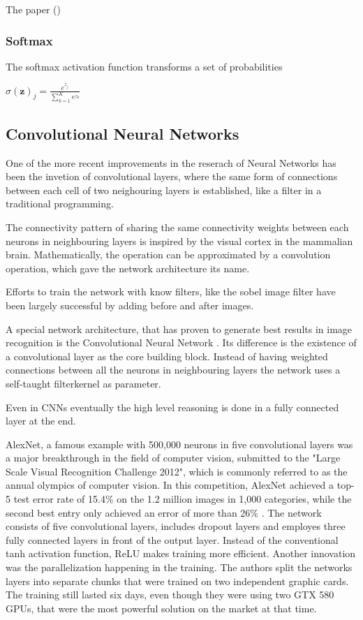The paper (\cite{DBLP:journals/corr/KlambauerUMH17})


\subsubsection{Softmax}
The softmax activation function transforms a set of probabilities

{\centering
	$\displaystyle \sigma (\mathbf {z} )_{j}={\frac {e^{z_{j}}}{\sum _{k=1}^{K}e^{z_{k}}}}$
	\par
}

\subsection{Convolutional Neural Networks}

One of the more recent improvements in the reserach of Neural Networks has been the invetion of convolutional layers, where the same form of connections between each cell of two neighouring layers is established, like a filter in a traditional programming. 

The connectivity pattern of sharing the same connectivity weights between each neurons in neighbouring layers is inspired by the visual cortex in the mammalian brain.
Mathematically, the operation can be approximated by a convolution operation, which gave the network architecture its name. 

Efforts to train the network with know filters, like the sobel image filter have been largely successful by adding before and after images.  

A special network architecture, that has proven to generate best results in image recognition is the Convolutional Neural Network \cite{Lecun98gradient-basedlearning}.
Its difference is the existence of a convolutional layer as the core building block.
Instead of having weighted connections between all the neurons in neighbouring layers the network uses a self-taught filterkernel as parameter.


Even in CNNs eventually the high level reasoning is done in a fully connected layer at the end.

AlexNet, a famous example with 500,000 neurons in five convolutional layers \cite{AlexNet} was a major breakthrough in the field of computer vision, submitted to the "Large Scale Visual Recognition Challenge 2012", which is commonly referred to as the annual olympics of computer vision.
In this competition, AlexNet achieved a top-5 test error rate of 15.4\% on the 1.2 million images in 1,000 categories, while the second best entry only achieved an error of more than 26\% \cite{ILSVRC15}. 
The network consists of five convolutional layers, includes dropout layers and employes three fully connected layers in front of the output layer. Instead of the conventional tanh activation function, ReLU makes training more efficient.
Another innovation was the parallelization happening in the training. The authors split the networks layers into separate chunks that were trained on two independent graphic cards. The training still lasted six days, even though they were using two GTX 580 GPUs, that were the most powerful solution on the market at that time.



